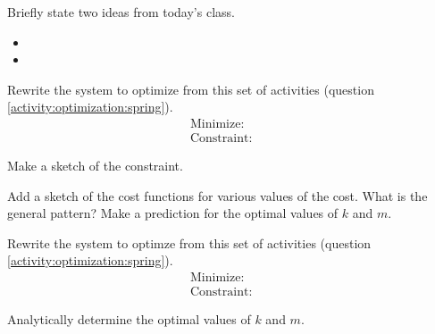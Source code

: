 \begin{problem}
\item Briefly state two ideas from today's class.
  \begin{itemize}
  \item
  \item
  \end{itemize}


\item Rewrite the system to optimize from this set of activities
  (question \ref{activity:optimization:spring}).
    \begin{eqnarray*}
      \mathrm{Minimize:} & &  \\
      \mathrm{Constraint:} & &
    \end{eqnarray*}
    \begin{subproblem}
    \item Make a sketch of the constraint.  

      \vfill

    \item Add a sketch of the cost functions for various values of the
      cost. What is the general pattern? Make a prediction for the
      optimal values of $k$ and $m$.

      \vspace{3em}
    \end{subproblem}
\clearpage

\item Rewrite the system to optimze from this set of activities
  (question \ref{activity:optimization:spring}).
  \begin{eqnarray*}
    \mathrm{Minimize:} & &  \\
    \mathrm{Constraint:} & &
  \end{eqnarray*}

  \begin{subproblem}
  \item Analytically determine the optimal values of $k$ and $m$.
    \vfill
  \end{subproblem}
\end{problem}


